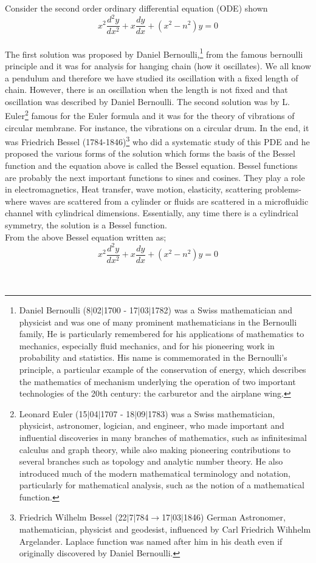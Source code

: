 	Consider the second order ordinary differential equation (ODE) shown $$x^2 \frac{d^2 y}{dx^2} + x \frac{dy}{dx} + (x^2 - n^2)y = 0$$
	\\
	The first solution was proposed by Daniel Bernoulli,\footnote{Daniel Bernoulli (8$|$02$|$1700 - 17$|$03$|$1782) was a Swiss mathematician and physicist and was one of many prominent mathematicians in the Bernoulli family, He is particularly remembered for his applications of mathematics to mechanics, especially fluid mechanics, and for his pioneering work in probability and statistics. His name is commemorated in the Bernoulli's principle, a particular example of the conservation of energy, which describes the mathematics of mechanism underlying the operation of two important technologies of the 20th century: the carburetor and the airplane wing.}
	from the famous bernoulli principle and it was for analysis for hanging chain (how it oscillates). We all know a pendulum and therefore we have studied its oscillation with a fixed length of chain. However, there is an oscillation when the length is not fixed and that oscillation was described by Daniel Bernoulli. The second solution was by L. Euler\footnote{Leonard Euler (15$|$04$|$1707 - 18$|$09$|$1783) was a Swiss mathematician, physicist, astronomer, logician, and engineer, who made important and influential discoveries in many branches of mathematics, such as infinitesimal calculus and graph theory, while also making pioneering contributions to several branches such as topology and analytic number theory. He also introduced much of the modern mathematical terminology and notation, particularly for mathematical analysis, such as the notion of a mathematical function.} famous for the Euler formula and it was for the theory of vibrations of circular membrane. For instance, the vibrations on a circular drum. In the end, it was Friedrich Bessel (1784-1846)\footnote{Friedrich Wilhelm Bessel (22$|$7$|$784$\rightarrow$17$|$03$|$1846) German Astronomer, mathematician, physicist and geodesist, influenced by Carl Friedrich Wihhelm Argelander. Laplace function was named after him in his death even if originally discovered by Daniel Bernoulli.} who did a systematic study of this PDE and he proposed the various forms of the solution which forms the basis of the Bessel function and the equation above is called the Bessel equation. Bessel functions are probably the next important functions to sines and cosines. They play a role in electromagnetics, Heat transfer, wave motion, elasticity, scattering problems- where waves are scattered from a cylinder or fluids are scattered in a microfluidic channel with cylindrical dimensions. Essentially, any time there is a cylindrical symmetry, the solution is a Bessel function.
	  \\
	  From the above Bessel equation written as;
	  $$x^2 \frac{d^2 y}{dx^2} + x \frac{dy}{dx} + (x^2 - n^2)y = 0$$ \hspace{0.8cm}
	  \\\\
	  
